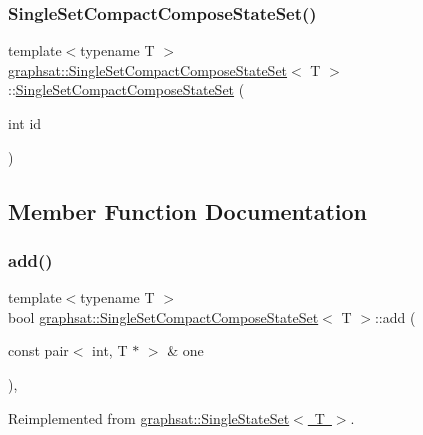 \subsubsection{\texorpdfstring{SingleSetCompactComposeStateSet()}{SingleSetCompactComposeStateSet()}}
{\footnotesize\ttfamily template$<$typename T $>$ \\
\mbox{\hyperlink{classgraphsat_1_1_single_set_compact_compose_state_set}{graphsat\+::\+Single\+Set\+Compact\+Compose\+State\+Set}}$<$ T $>$\+::\mbox{\hyperlink{classgraphsat_1_1_single_set_compact_compose_state_set}{Single\+Set\+Compact\+Compose\+State\+Set}} (\begin{DoxyParamCaption}\item[{int}]{id }\end{DoxyParamCaption})\hspace{0.3cm}{\ttfamily [inline]}}



\subsection{Member Function Documentation}
\mbox{\label{classgraphsat_1_1_single_set_compact_compose_state_set_a51dc5d12b4a54e6b8d724d0496367b7f}} 
\subsubsection{\texorpdfstring{add()}{add()}}
{\footnotesize\ttfamily template$<$typename T $>$ \\
bool \mbox{\hyperlink{classgraphsat_1_1_single_set_compact_compose_state_set}{graphsat\+::\+Single\+Set\+Compact\+Compose\+State\+Set}}$<$ T $>$\+::add (\begin{DoxyParamCaption}\item[{const pair$<$ int, T $\ast$ $>$ \&}]{one }\end{DoxyParamCaption})\hspace{0.3cm}{\ttfamily [inline]}, {\ttfamily [virtual]}}



Reimplemented from \mbox{\hyperlink{classgraphsat_1_1_single_state_set_a5fb0f789a7429ca9ad94003f4e639570}{graphsat\+::\+Single\+State\+Set$<$ T $>$}}.

